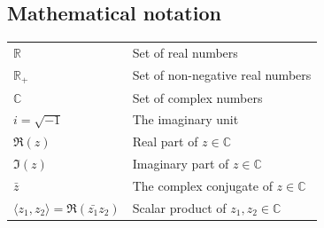 \documentclass[journal]{IEEEtran}
\begin{document}
	\subsection{Mathematical notation}
	\begin{tabular}{ l l }
		${\mathbb{R}}$ & Set of real numbers  \\
		${\mathbb{R}_+}$ & Set of non-negative real numbers  \\
		${\mathbb{C}}$ & Set of complex numbers \\
		${i = \sqrt{-1}}$ & The imaginary unit \\
		${\Re (z)}$ & Real part of ${z \in \mathbb{C}}$ \\
		${\Im (z)}$ & Imaginary part of ${z \in \mathbb{C}}$ \\
		${\bar{z}}$ & The complex conjugate of ${z \in \mathbb{C}}$ \\
		${\langle z_1,z_2  \rangle = \Re(\bar{z_1}z_2)}$ & Scalar product of ${z_1, z_2 \in \mathbb{C}}$ \\
	\end{tabular}
	
\end{document}
